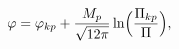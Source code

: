 \begin{equation}\label{region1eom2b}
\varphi={\varphi_{kp}}+\frac{M_{p}}{\sqrt{12\pi}}\ln \Bigl(
\frac{{\Pi}_{kp}}{\Pi} \Bigr),
\end{equation}

